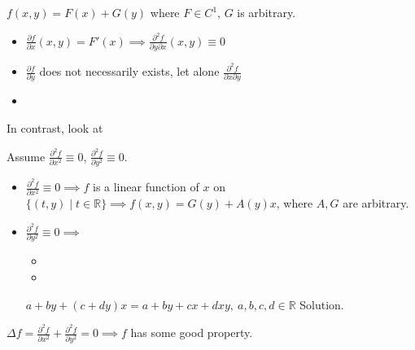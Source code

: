 \begin{example}
    $f(x,y)=F(x)+G(y)$ where $F\in C^1$, $G$ is arbitrary.
    \begin{itemize}
        \item $\frac{\partial f}{\partial x}(x,y)=F'(x)\implies\boxed{\frac{\partial^2 f}{\partial y\partial x}(x,y)\equiv0}$
        \item $\frac{\partial f}{\partial y}$ does not necessarily exists, let alone $\frac{\partial^2f}{\partial x\partial y}$
        \item {}
    \end{itemize}
\end{example}
In contrast, look at
\begin{example}
    Assume $\frac{\partial^2f}{\partial x^2}\equiv0$, $\frac{\partial^2f}{\partial y^2}\equiv0$.
    \begin{itemize}
        \item $\frac{\partial^2f}{\partial x^2}\equiv0\implies f$ is a linear function of $x$ on $\{(t,y)\mid t\in\mathbb{R}\}\implies f(x,y)=G(y)+A(y)x$, where $A,G$ are arbitrary.
        \item $\frac{\partial^2f}{\partial y^2}\equiv0\implies$\begin{itemize}
                  \item {}
                  \item {}
              \end{itemize}
              $a+by+(c+dy)x=a+by+cx+dxy,\ a,b,c,d\in\mathbb{R}$ Solution.
    \end{itemize}
    \begin{remark}
        $\Delta f=\frac{\partial^2f}{\partial x^2}+\frac{\partial^2 f}{\partial y^2}=0\implies f$ has some good property.
    \end{remark}
\end{example}